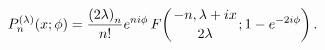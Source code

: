 \[\mathop{P^{(\lambda)}_{n}\/}\nolimits\!\left(x;\phi\right)=\frac{\left(2%
\lambda\right)_{n}}{n!}e^{ni\phi}\mathop{F\/}\nolimits\!\left({-n,\lambda+ix%
\atop 2\lambda};1-e^{-2i\phi}\right).\]